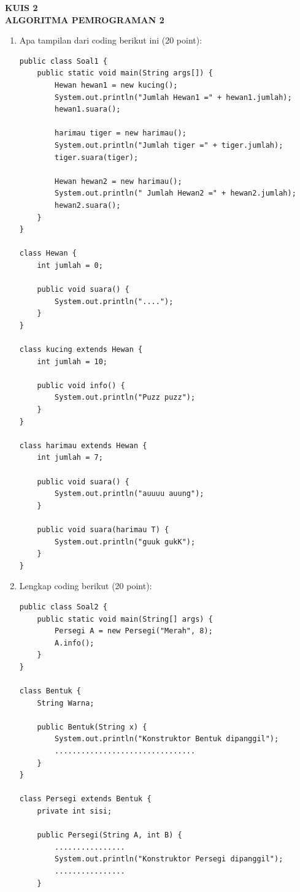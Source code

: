 \documentclass[12pt,a4paper]{article}
\begin{document}
\begin{center}
  \textbf{KUIS 2}\\
  \textbf{ALGORITMA PEMROGRAMAN 2}
\end{center}

\begin{enumerate}[label=\arabic*.]
  \item Apa tampilan dari coding berikut ini (20 point):

        \begin{verbatim}
public class Soal1 {
    public static void main(String args[]) {
        Hewan hewan1 = new kucing();
        System.out.println("Jumlah Hewan1 =" + hewan1.jumlah);
        hewan1.suara();

        harimau tiger = new harimau();
        System.out.println("Jumlah tiger =" + tiger.jumlah);
        tiger.suara(tiger);

        Hewan hewan2 = new harimau();
        System.out.println(" Jumlah Hewan2 =" + hewan2.jumlah);
        hewan2.suara();
    }
}

class Hewan {
    int jumlah = 0;

    public void suara() {
        System.out.println("....");
    }
}

class kucing extends Hewan {
    int jumlah = 10;

    public void info() {
        System.out.println("Puzz puzz");
    }
}

class harimau extends Hewan {
    int jumlah = 7;

    public void suara() {
        System.out.println("auuuu auung");
    }

    public void suara(harimau T) {
        System.out.println("guuk gukK");
    }
}
\end{verbatim}

  \item Lengkap coding berikut (20 point):

        \begin{verbatim}
public class Soal2 {
    public static void main(String[] args) {
        Persegi A = new Persegi("Merah", 8);
        A.info();
    }
}

class Bentuk {
    String Warna;

    public Bentuk(String x) {
        System.out.println("Konstruktor Bentuk dipanggil");
        ................................
    }
}

class Persegi extends Bentuk {
    private int sisi;

    public Persegi(String A, int B) {
        ................
        System.out.println("Konstruktor Persegi dipanggil");
        ................
    }


\end{verbatim}
\end{enumerate}
\end{document}
